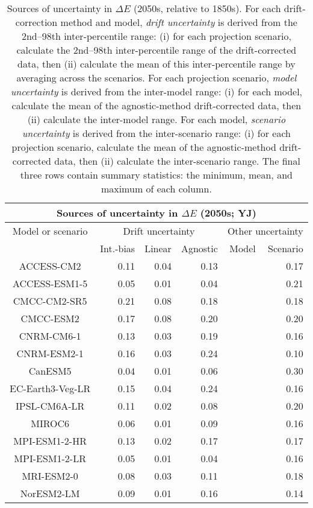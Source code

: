 \begin{table*}[t]
\centering
\caption{Sources of uncertainty in $\Delta E$ (2050s, relative to 1850s). For each drift-correction method and model, \emph{drift uncertainty} is derived from the 2nd--98th inter-percentile range: (i) for each projection scenario, calculate the 2nd--98th inter-percentile range of the drift-corrected data, then (ii) calculate the mean of this inter-percentile range by averaging across the scenarios. For each projection scenario, \emph{model uncertainty} is derived from the inter-model range: (i) for each model, calculate the mean of the agnostic-method drift-corrected data, then (ii) calculate the inter-model range. For each model, \emph{scenario uncertainty} is derived from the inter-scenario range: (i) for each projection scenario, calculate the mean of the agnostic-method drift-corrected data, then (ii) calculate the inter-scenario range. The final three rows contain summary statistics: the minimum, mean, and maximum of each column.}
\begin{tabular}{c|rrr|rr}
\toprule
\multicolumn{6}{c}{Sources of uncertainty in $\Delta E$ (2050s; YJ)} \\ 
\midrule
Model or scenario & \multicolumn{3}{c|}{Drift uncertainty} & \multicolumn{2}{c}{Other uncertainty} \\
 & Int.-bias & Linear & Agnostic & Model & Scenario \\
\midrule
ACCESS-CM2 & 0.11 & 0.04 & 0.13 &  & 0.17 \\
ACCESS-ESM1-5 & 0.05 & 0.01 & 0.04 &  & 0.21 \\
CMCC-CM2-SR5 & 0.21 & 0.08 & 0.18 &  & 0.18 \\
CMCC-ESM2 & 0.17 & 0.08 & 0.20 &  & 0.20 \\
CNRM-CM6-1 & 0.13 & 0.03 & 0.19 &  & 0.16 \\
CNRM-ESM2-1 & 0.16 & 0.03 & 0.24 &  & 0.10 \\
CanESM5 & 0.04 & 0.01 & 0.06 &  & 0.30 \\
EC-Earth3-Veg-LR & 0.15 & 0.04 & 0.24 &  & 0.16 \\
IPSL-CM6A-LR & 0.11 & 0.02 & 0.08 &  & 0.20 \\
MIROC6 & 0.06 & 0.01 & 0.09 &  & 0.16 \\
MPI-ESM1-2-HR & 0.13 & 0.02 & 0.17 &  & 0.17 \\
MPI-ESM1-2-LR & 0.05 & 0.01 & 0.04 &  & 0.16 \\
MRI-ESM2-0 & 0.08 & 0.03 & 0.11 &  & 0.18 \\
NorESM2-LM & 0.09 & 0.01 & 0.16 &  & 0.14 \\

\end{tabular}
\end{table*}
